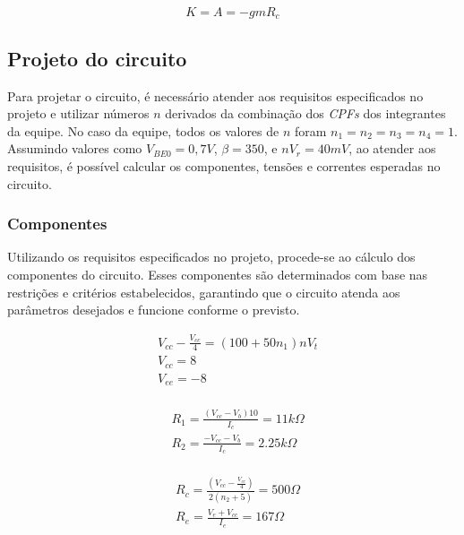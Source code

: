 \begin{equation}
    \label{eq:K}
    K = A = - gm R_c
\end{equation}


\subsection{Projeto do circuito}

Para projetar o circuito, é necessário atender aos requisitos especificados no projeto e utilizar números $n$ derivados da combinação dos \emph{CPFs} dos integrantes da equipe. No caso da equipe, todos os valores de $n$ foram $n_1 = n_2 = n_3 = n_4 = 1$. Assumindo valores como $V_{BE0} = 0,7 V$, $\beta = 350$, e $n V_r = 40 mV$, ao atender aos requisitos, é possível calcular os componentes, tensões e correntes esperadas no circuito.

\subsubsection{Componentes}

Utilizando os requisitos especificados no projeto, procede-se ao cálculo dos componentes do circuito. Esses componentes são determinados com base nas restrições e critérios estabelecidos, garantindo que o circuito atenda aos parâmetros desejados e funcione conforme o previsto.

\begin{equation}
    \begin{aligned}
         & V_{cc} - \frac{V_{cc}}{4} = (100 + 50 n_1) n V_t \\
         & V_{cc} = 8                                       \\
         & V_{ee} = -8                                      \\
    \end{aligned}
\end{equation}

\begin{equation}
    \begin{aligned}
         & R_1 = \frac{(V_{cc} - V_b)  10}{I_c} = 11 k \varOmega \\
         & R_2 = \frac{- V_{cc} - V_b}{I_c} = 2.25 k \varOmega   \\
    \end{aligned}
\end{equation}

\begin{equation}
    \begin{aligned}
         & R_c = \frac{\left(V_{cc} - \frac{V_{cc}}{4}\right)}{2 (n_2 +5)} = 500\varOmega \\
         & R_e = \frac{V_e + V_{cc}}{I_e} = 167 \varOmega
    \end{aligned}
\end{equation}

